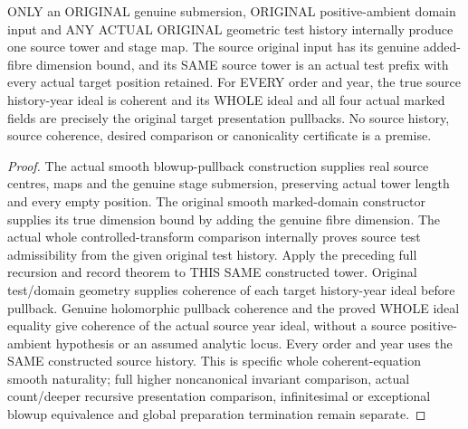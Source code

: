 \begin{theorem}
\label{hir:original-coherent-any-test-history-year-smooth-producer}
\leanok
ONLY an ORIGINAL genuine submersion, ORIGINAL positive-ambient domain
input and ANY ACTUAL ORIGINAL geometric test history internally produce
one source tower and stage map. The source original input has its genuine
added-fibre dimension bound, and its SAME source tower is an actual test
prefix with every actual target position retained. For EVERY order and
year, the true source history-year ideal is coherent and its WHOLE ideal
and all four actual marked fields are precisely the original target
presentation pullbacks. No source history, source coherence, desired
comparison or canonicality certificate is a premise.
\end{theorem}
\begin{proof}
The actual smooth blowup-pullback construction supplies real source
centres, maps and the genuine stage submersion, preserving actual tower
length and every empty position. The original smooth marked-domain
constructor supplies its true dimension bound by adding the genuine
fibre dimension. The actual whole controlled-transform comparison
internally proves source test admissibility from the given original
test history. Apply the preceding full recursion and record theorem to
THIS SAME constructed tower. Original test/domain geometry supplies
coherence of each target history-year ideal before pullback. Genuine
holomorphic pullback coherence and the proved WHOLE ideal equality give
coherence of the actual source year ideal, without a source positive-
ambient hypothesis or an assumed analytic locus. Every order and year
uses the SAME constructed source history. This is specific whole
coherent-equation smooth naturality; full higher noncanonical invariant
comparison, actual count/deeper recursive presentation comparison,
infinitesimal or exceptional blowup equivalence and global preparation
termination remain separate.
\end{proof}
